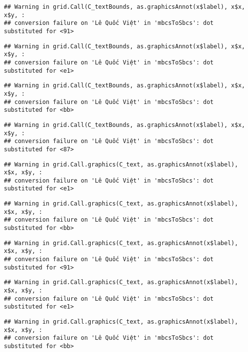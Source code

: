 \documentclass[
]{article}
\begin{document}
\begin{verbatim}
## Warning in grid.Call(C_textBounds, as.graphicsAnnot(x$label), x$x, x$y, :
## conversion failure on 'Lê Quốc Việt' in 'mbcsToSbcs': dot substituted for <91>
\end{verbatim}

\begin{verbatim}
## Warning in grid.Call(C_textBounds, as.graphicsAnnot(x$label), x$x, x$y, :
## conversion failure on 'Lê Quốc Việt' in 'mbcsToSbcs': dot substituted for <e1>
\end{verbatim}

\begin{verbatim}
## Warning in grid.Call(C_textBounds, as.graphicsAnnot(x$label), x$x, x$y, :
## conversion failure on 'Lê Quốc Việt' in 'mbcsToSbcs': dot substituted for <bb>
\end{verbatim}

\begin{verbatim}
## Warning in grid.Call(C_textBounds, as.graphicsAnnot(x$label), x$x, x$y, :
## conversion failure on 'Lê Quốc Việt' in 'mbcsToSbcs': dot substituted for <87>
\end{verbatim}

\begin{verbatim}
## Warning in grid.Call.graphics(C_text, as.graphicsAnnot(x$label), x$x, x$y, :
## conversion failure on 'Lê Quốc Việt' in 'mbcsToSbcs': dot substituted for <e1>
\end{verbatim}

\begin{verbatim}
## Warning in grid.Call.graphics(C_text, as.graphicsAnnot(x$label), x$x, x$y, :
## conversion failure on 'Lê Quốc Việt' in 'mbcsToSbcs': dot substituted for <bb>
\end{verbatim}

\begin{verbatim}
## Warning in grid.Call.graphics(C_text, as.graphicsAnnot(x$label), x$x, x$y, :
## conversion failure on 'Lê Quốc Việt' in 'mbcsToSbcs': dot substituted for <91>
\end{verbatim}

\begin{verbatim}
## Warning in grid.Call.graphics(C_text, as.graphicsAnnot(x$label), x$x, x$y, :
## conversion failure on 'Lê Quốc Việt' in 'mbcsToSbcs': dot substituted for <e1>
\end{verbatim}

\begin{verbatim}
## Warning in grid.Call.graphics(C_text, as.graphicsAnnot(x$label), x$x, x$y, :
## conversion failure on 'Lê Quốc Việt' in 'mbcsToSbcs': dot substituted for <bb>
\end{verbatim}
\end{document}
